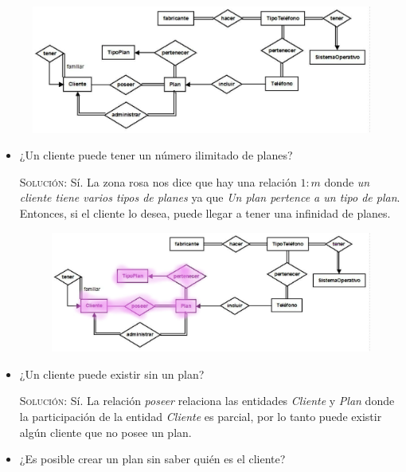 \documentclass[letterpaper,11pt]{article}
\begin{document}
\begin{figure}[h]
    \centering
    \includegraphics[scale=0.4]{./imagenes/modelo.jpg}
\end{figure}

\begin{itemize}
    \item ¿Un cliente puede tener un número ilimitado de planes?

    \textsc{Solución:} Sí. La zona rosa nos dice que hay una relación $1:m$ 
    donde \textit{un cliente tiene varios tipos de planes} ya que 
    \textit{Un plan pertence a un tipo de plan}. Entonces, si el 
    cliente lo desea, puede llegar a tener una infinidad de planes.

    \begin{figure}[h]
        \centering
        \includegraphics[scale=0.4]{./imagenes/modelo1.jpg}
    \end{figure}
    
    \item ¿Un cliente puede existir sin un plan?

    \textsc{Solución:} Sí. La relación \textit{poseer} relaciona las entidades \textit{Cliente} y \textit{Plan} donde la participación de la entidad \textit{Cliente} es parcial, por lo tanto puede existir algún cliente que no posee un plan. 

    \item ¿Es posible crear un plan sin saber quién es el cliente?
    

\end{itemize}
\end{document}

